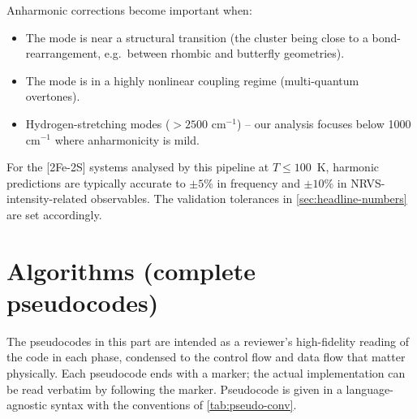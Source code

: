 \documentclass[10pt,a4paper,twoside]{article}
\newcommand{\codref}[1]{%
  \quad\text{\textcolor{gray!70!black}{\footnotesize $\rightsquigarrow$~\texttt{#1}}}}
\begin{document}
Anharmonic corrections become important when:
\begin{itemize}
  \item The mode is near a structural transition (the cluster
        being close to a bond-rearrangement, e.g.\ between
        rhombic and butterfly geometries).
  \item The mode is in a highly nonlinear coupling regime
        (multi-quantum overtones).
  \item Hydrogen-stretching modes ($> 2500$ cm$^{-1}$) -- our
        analysis focuses below 1000 cm$^{-1}$ where anharmonicity
        is mild.
\end{itemize}
For the [2Fe-2S] systems analysed by this pipeline at $T \leq 100$~K,
harmonic predictions are typically accurate to $\pm 5$\% in
frequency and $\pm 10$\% in NRVS-intensity-related observables.
The validation tolerances in \cref{sec:headline-numbers} are set
accordingly.

\part{Algorithms (complete pseudocodes)}
\label{part:algorithms}

The pseudocodes in this part are intended as a reviewer's
high-fidelity reading of the code in each phase, condensed to the
control flow and data flow that matter physically. Each pseudocode
ends with a \codref{} marker; the actual implementation can be read
verbatim by following the marker. Pseudocode is given in a
language-agnostic syntax with the conventions of \cref{tab:pseudo-conv}.
\end{document}
